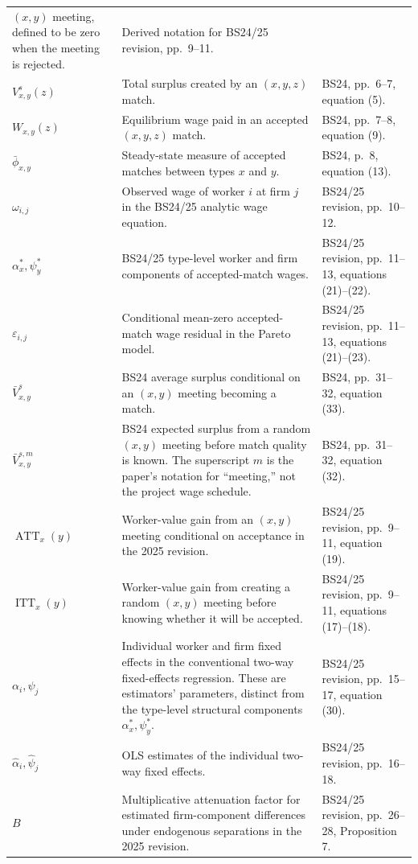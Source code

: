 \documentclass[11pt]{article}
\begin{document}
\begin{longtable}{p{}p{}p{}}
\((x,y)\) meeting, defined to be zero when the meeting is rejected. & Derived
notation for BS24/25 revision, pp.\ 9--11. \\
\(V^s_{x,y}(z)\) & Total surplus created by an \((x,y,z)\) match. & BS24,
pp.\ 6--7, equation (5). \\
\(W_{x,y}(z)\) & Equilibrium wage paid in an accepted
\((x,y,z)\) match. & BS24, pp.\ 7--8, equation (9). \\
\(\bar\phi_{x,y}\) & Steady-state measure of accepted matches between types
\(x\) and \(y\). & BS24, p.\ 8, equation (13). \\
\(\omega_{i,j}\) & Observed wage of worker \(i\) at firm \(j\) in the BS24/25
analytic wage equation. & BS24/25 revision, pp.\ 10--12. \\
\(\alpha_x^*,\psi_y^*\) & BS24/25 type-level worker and firm components of
accepted-match wages. & BS24/25 revision, pp.\ 11--13,
equations (21)--(22). \\
\(\varepsilon_{i,j}\) & Conditional mean-zero accepted-match wage residual in
the Pareto model. & BS24/25 revision, pp.\ 11--13,
equations (21)--(23). \\
\(\bar V^s_{x,y}\) & BS24 average surplus conditional on an \((x,y)\) meeting
becoming a match. & BS24, pp.\ 31--32, equation (33). \\
\(\bar V^{s,m}_{x,y}\) & BS24 expected surplus from a random \((x,y)\)
meeting before match quality is known.  The superscript \(m\) is the paper's
notation for ``meeting,'' not the project wage schedule. & BS24, pp.\ 31--32,
equation (32). \\
\(\operatorname{ATT}_x(y)\) & Worker-value gain from an \((x,y)\) meeting
conditional on acceptance in the 2025 revision. & BS24/25 revision,
pp.\ 9--11, equation (19). \\
\(\operatorname{ITT}_x(y)\) & Worker-value gain from creating a random
\((x,y)\) meeting before knowing whether it will be accepted. & BS24/25
revision, pp.\ 9--11, equations (17)--(18). \\
\(\alpha_i,\psi_j\) & Individual worker and firm fixed effects in the
conventional two-way fixed-effects regression.  These are estimators'
parameters, distinct from the type-level structural components
\(\alpha_x^*,\psi_y^*\). & BS24/25 revision, pp.\ 15--17,
equation (30). \\
\(\widehat\alpha_i,\widehat\psi_j\) & OLS estimates of the individual
two-way fixed effects. & BS24/25 revision, pp.\ 16--18. \\
\(B\) & Multiplicative attenuation factor for estimated firm-component
differences under endogenous separations in the 2025 revision. & BS24/25
revision, pp.\ 26--28, Proposition 7. \\
\end{longtable}
\end{document}
